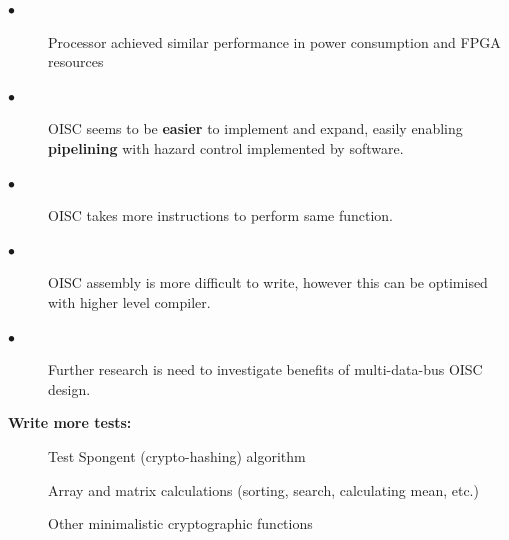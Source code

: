 \documentclass[portrait,color=UCLmidgreen,margin=1.5cm,bannerheight=8cm,logoheight=3.5cm]{uclposter}
\begin{document}
\begin{tcolorbox}[title=Results,beforeafter skip=22pt]
%	
\end{tcolorbox}

\begin{Row}\begin{Cell}{1}

\begin{tcolorbox}[title=Conclusion]
	\begin{description}
		\item[$\bullet$] Processor achieved similar performance in power consumption and FPGA resources
		\item[$\bullet$] OISC seems to be \textbf{easier} to implement and expand, easily enabling \textbf{pipelining} with hazard control implemented by software.
		\item[$\bullet$] OISC takes more instructions to perform same function.
		\item[$\bullet$] OISC assembly is more difficult to write, however this can be optimised with higher level compiler.
		\item[$\bullet$] Further research is need to investigate benefits of multi-data-bus OISC design.
	\end{description}
\end{tcolorbox}	

\end{Cell}\begin{Cell}{2}

\begin{tcolorbox}[title=Future work]
	\begin{multicols}{2}
		\textbf{Write more tests:}
		\begin{description}
			\item[\textendash] Test Spongent (crypto-hashing) algorithm
			\item[\textendash] Array and matrix calculations (sorting, search, calculating mean, etc.)
			\item[\textendash] Other minimalistic cryptographic functions
		\end{description}
	

\end{multicols}
\end{tcolorbox}
\end{Cell}
\end{Row}
\end{document}
